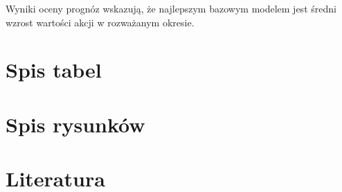 \documentclass{article}
\begin{document}
Wyniki oceny prognóz wskazują, że najlepszym bazowym modelem jest średni wzrost wartości akcji w rozważanym okresie.


\newpage
\section{Spis tabel}
\renewcommand\listtablename{}
\listoftables


\newpage
\section{Spis rysunków}
\renewcommand\listfigurename{}
\listoffigures


\newpage
\section{Literatura}
\printbibliography[heading=none]
\end{document}
